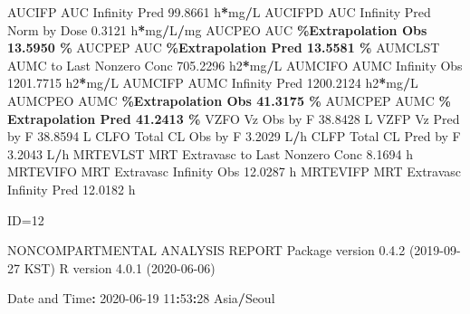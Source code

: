 \documentclass[
  10pt,
]{krantz}
\makeatletter
\newenvironment{Shaded}{\begin{snugshade}}{\end{snugshade}}
\newcommand{\DecValTok}[1]{\textcolor[rgb]{0.00,0.00,0.81}{#1}}
\newcommand{\FloatTok}[1]{\textcolor[rgb]{0.00,0.00,0.81}{#1}}
\newcommand{\NormalTok}[1]{#1}
\newcommand{\OperatorTok}[1]{\textcolor[rgb]{0.81,0.36,0.00}{\textbf{#1}}}
\newcommand{\StringTok}[1]{\textcolor[rgb]{0.31,0.60,0.02}{#1}}
\newenvironment{kframe}{%
\medskip{}
\setlength{\fboxsep}{.8em}
 \def\at@end@of@kframe{}%
 \ifinner\ifhmode%
  \def\at@end@of@kframe{\end{minipage}}%
  \begin{minipage}{\columnwidth}%
 \fi\fi%
 \def\FrameCommand##1{\hskip\@totalleftmargin \hskip-\fboxsep
 \colorbox{shadecolor}{##1}\hskip-\fboxsep
     \hskip-\linewidth \hskip-\@totalleftmargin \hskip\columnwidth}%
 \MakeFramed {\advance\hsize-\width
   \@totalleftmargin\z@ \linewidth\hsize
   \@setminipage}}%
 {\par\unskip\endMakeFramed%
 \at@end@of@kframe}
\renewenvironment{Shaded}{\begin{kframe}}{\end{kframe}}
\makeatother
\begin{document}
\begin{Shaded}
\begin{Highlighting}[]
\NormalTok{AUCIFP     AUC Infinity Pred                              }\FloatTok{99.8661}\NormalTok{ h}\OperatorTok{*}\NormalTok{mg}\OperatorTok{/}\NormalTok{L}
\NormalTok{AUCIFPD    AUC Infinity Pred Norm by Dose                  }\FloatTok{0.3121}\NormalTok{ h}\OperatorTok{*}\NormalTok{mg}\OperatorTok{/}\NormalTok{L}\OperatorTok{/}\NormalTok{mg}
\NormalTok{AUCPEO     AUC }\OperatorTok{\%Extrapolation Obs                         13.5950 \%}
\NormalTok{AUCPEP     AUC }\OperatorTok{\%Extrapolation Pred                        13.5581 \%}
\NormalTok{AUMCLST    AUMC to Last Nonzero Conc                     }\FloatTok{705.2296}\NormalTok{ h2}\OperatorTok{*}\NormalTok{mg}\OperatorTok{/}\NormalTok{L}
\NormalTok{AUMCIFO    AUMC Infinity Obs                            }\FloatTok{1201.7715}\NormalTok{ h2}\OperatorTok{*}\NormalTok{mg}\OperatorTok{/}\NormalTok{L}
\NormalTok{AUMCIFP    AUMC Infinity Pred                           }\FloatTok{1200.2124}\NormalTok{ h2}\OperatorTok{*}\NormalTok{mg}\OperatorTok{/}\NormalTok{L}
\NormalTok{AUMCPEO    AUMC }\OperatorTok{\%Extrapolation Obs                        41.3175 \%}
\NormalTok{AUMCPEP    AUMC }\OperatorTok{\% Extrapolation Pred                      41.2413 \%}
\NormalTok{VZFO       Vz Obs by F                                    }\FloatTok{38.8428}\NormalTok{ L}
\NormalTok{VZFP       Vz Pred by F                                   }\FloatTok{38.8594}\NormalTok{ L}
\NormalTok{CLFO       Total CL Obs by F                               }\FloatTok{3.2029}\NormalTok{ L}\OperatorTok{/}\NormalTok{h}
\NormalTok{CLFP       Total CL Pred by F                              }\FloatTok{3.2043}\NormalTok{ L}\OperatorTok{/}\NormalTok{h}
\NormalTok{MRTEVLST   MRT Extravasc to Last Nonzero Conc              }\FloatTok{8.1694}\NormalTok{ h}
\NormalTok{MRTEVIFO   MRT Extravasc Infinity Obs                     }\FloatTok{12.0287}\NormalTok{ h}
\NormalTok{MRTEVIFP   MRT Extravasc Infinity Pred                    }\FloatTok{12.0182}\NormalTok{ h}





\NormalTok{ID=}\DecValTok{12}

\NormalTok{                        NONCOMPARTMENTAL ANALYSIS REPORT}
\NormalTok{                       Package version }\DecValTok{0}\NormalTok{.}\FloatTok{4.2}\NormalTok{ (}\DecValTok{2019{-}09{-}27}\NormalTok{ KST)}
\NormalTok{                          R version }\DecValTok{4}\NormalTok{.}\FloatTok{0.1}\NormalTok{ (}\DecValTok{2020{-}06{-}06}\NormalTok{)}

\NormalTok{Date and Time}\OperatorTok{:}\StringTok{ }\DecValTok{2020{-}06{-}19} \DecValTok{11}\OperatorTok{:}\DecValTok{53}\OperatorTok{:}\DecValTok{28}\NormalTok{ Asia}\OperatorTok{/}\NormalTok{Seoul}


\end{Highlighting}
\end{Shaded}
\end{document}
